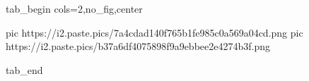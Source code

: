  
 
 
 
 


\ifcmt
  tab_begin cols=2,no_fig,center

     pic https://i2.paste.pics/7a4cdad140f765b1fe985c0a569a04cd.png
		 pic https://i2.paste.pics/b37a6df4075898f9a9ebbee2e4274b3f.png

  tab_end
\fi
